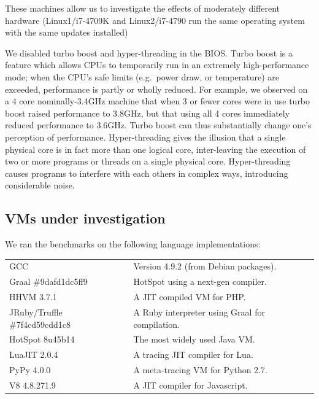 \documentclass[a4paper,UKenglish]{lipics}
\newcommand{\hyptwo}{H2\xspace}
\newcommand{\bencherthree}{Linux1/i7-4709K\xspace}
\newcommand{\bencherfive}{Linux2/i7-4790\xspace}
\newcommand{\benchersix}{OpenBSD/i7-4790\xspace}
\begin{document}
\noindent These machines allow us to investigate the effects of moderately different
hardware (\bencherthree and \bencherfive run the same operating system with the
same updates installed)

We disabled turbo boost and hyper-threading in the BIOS. Turbo boost is a
feature which allows CPUs to temporarily run in an extremely high-performance
mode; when the CPU's safe limits (e.g.~power draw, or temperature) are exceeded,
performance is partly or wholly reduced. For example, we observed on a 4 core
nominally-3.4GHz machine that when 3 or fewer cores were in use turbo boost
raised performance to 3.8GHz, but that using all 4 cores immediately reduced
performance to 3.6GHz. Turbo boost can thus substantially change one's
perception of performance. Hyper-threading gives the illusion that a single
physical core is in fact more than one logical core, inter-leaving the
execution of two or more programs or threads on a single physical core.
Hyper-threading causes programs to interfere
with each others in complex ways, introducing considerable noise.


\subsection{VMs under investigation}

We ran the benchmarks on the following language implementations:

\begin{tabular}{ll}
GCC & Version 4.9.2 (from Debian packages). \\
Graal \#9dafd1dc5ff9 & HotSpot using a next-gen compiler. \\
HHVM 3.7.1 & A JIT compiled VM for PHP. \\
JRuby/Truffle \#7f4cd59cdd1c8 & A Ruby interpreter using Graal for compilation. \\
HotSpot 8u45b14 & The most widely used Java VM. \\
LuaJIT 2.0.4 & A tracing JIT compiler for Lua. \\
PyPy 4.0.0 & A meta-tracing VM for Python 2.7. \\
V8 4.8.271.9 & A JIT compiler for Javascript.
\end{tabular}
%
\end{document}
